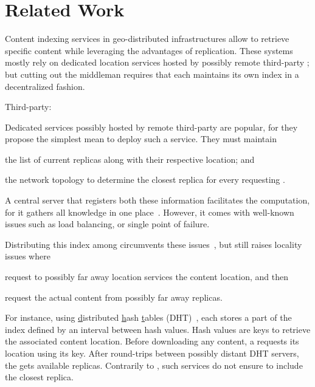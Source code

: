 
\section{Related Work}
\label{sec:related_work}

Content indexing services in geo-distributed infrastructures allow
\processes to retrieve specific content while leveraging the
advantages of replication. These systems mostly rely on dedicated
location services hosted by possibly remote third-party \processes; but
cutting out the middleman requires that each \process maintains its
own index in a decentralized fashion.

\begin{asparadesc}
\item [Third-party:]

Dedicated services possibly hosted by remote third-party \processes
are popular, for they propose the simplest mean to deploy such a
service. They must maintain
\begin{inparaenum}[(i)]
\item the list of current replicas along with their respective
  location; and
\item the network topology to determine the closest replica for every
  requesting \process.
\end{inparaenum}

\noindent A central server that registers both these information
facilitates the computation, for it gathers all knowledge in one
place~\cite{snamp, p2p-oracle, fogstore, p2p-alto}. However, it comes with
well-known issues such as load balancing, or single point of failure.

\noindent Distributing this index among \processes circumvents these
issues~\cite{voronet, ipfs, mdht, squirrel, triukose2011measuring,
  coin_19}, but still raises locality issues where \processes
\begin{inparaenum}[(i)]
\item request to possibly far away location services the content
  location, and then
\item request the actual content from possibly far away replicas.
\end{inparaenum}
For instance, using \underline{d}istributed \underline{h}ash
\underline{t}ables (DHT)~\cite{ipfs, mdht, squirrel}, each \process
stores a part of the index defined by an interval between hash values.
Hash values are keys to retrieve the associated content location.
Before downloading any content, a \node requests its location using
its key. After round-trips between possibly distant DHT servers, the
\node gets available replicas. Contrarily to \NAME, such services do
not ensure to include the closest replica.


\end{asparadesc}
